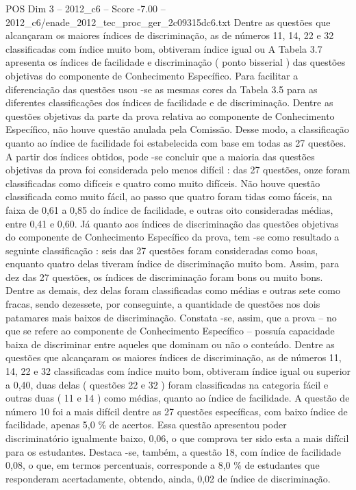 \begin{textsample}{POS Dim 3 – 2012\_c6 – Score -7.00 – 2012\_c6/enade\_2012\_tec\_proc\_ger\_2c09315dc6.txt}
Dentre as questões que alcançaram os maiores índices de discriminação, as de números 11, 14, 22 e 32 classificadas com índice muito bom, obtiveram índice igual ou A Tabela 3.7 apresenta os índices de facilidade e discriminação ( ponto bisserial ) das questões objetivas do componente de Conhecimento Específico.
Para facilitar a diferenciação das questões usou -se as mesmas cores da Tabela 3.5 para as diferentes classificações dos índices de facilidade e de discriminação.
Dentre as questões objetivas da parte da prova relativa ao componente de Conhecimento Específico, não houve questão anulada pela Comissão.
Desse modo, a classificação quanto ao índice de facilidade foi estabelecida com base em todas as 27 questões.
A partir dos índices obtidos, pode -se concluir que a maioria das questões objetivas da prova foi considerada pelo menos difícil : das 27 questões, onze foram classificadas como difíceis e quatro como muito difíceis.
Não houve questão classificada como muito fácil, ao passo que quatro foram tidas como fáceis, na faixa de 0,61 a 0,85 do índice de facilidade, e outras oito consideradas médias, entre 0,41 e 0,60.
Já quanto aos índices de discriminação das questões objetivas do componente de Conhecimento Específico da prova, tem -se como resultado a seguinte classificação : seis das 27 questões foram consideradas como boas, enquanto quatro delas tiveram índice de discriminação muito bom.
Assim, para dez das 27 questões, os índices de discriminação foram bons ou muito bons.
Dentre as demais, dez delas foram classificadas como médias e outras sete como fracas, sendo dezessete, por conseguinte, a quantidade de questões nos dois patamares mais baixos de discriminação.
Constata -se, assim, que a prova – no que se refere ao componente de Conhecimento Específico – possuía capacidade baixa de discriminar entre aqueles que dominam ou não o conteúdo.
Dentre as questões que alcançaram os maiores índices de discriminação, as de números 11, 14, 22 e 32 classificadas com índice muito bom, obtiveram índice igual ou superior a 0,40, duas delas ( questões 22 e 32 ) foram classificadas na categoria fácil e outras duas ( 11 e 14 ) como médias, quanto ao índice de facilidade.
A questão de número 10 foi a mais difícil dentre as 27 questões específicas, com baixo índice de facilidade, apenas 5,0 \% de acertos.
Essa questão apresentou poder discriminatório igualmente baixo, 0,06, o que comprova ter sido esta a mais difícil para os estudantes.
Destaca -se, também, a questão 18, com índice de facilidade 0,08, o que, em termos percentuais, corresponde a 8,0 \% de estudantes que responderam acertadamente, obtendo, ainda, 0,02 de índice de discriminação.

\end{textsample}
